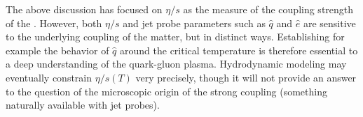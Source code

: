 


The above discussion has focused on $\eta/s$ as the measure of the
coupling strength of the \qgp.  However, both $\eta/s$ and jet probe
parameters such as $\hat{q}$ and $\hat{e}$ are sensitive to the
underlying coupling of the matter, but in distinct ways. Establishing
for example the behavior of $\hat{q}$ around the critical temperature
is therefore essential to a deep understanding of the quark-gluon
plasma.  Hydrodynamic modeling may eventually constrain $\eta/s(T)$
very precisely, though it will not provide an answer to the question
of the microscopic origin of the strong coupling (something naturally
available with jet probes).

